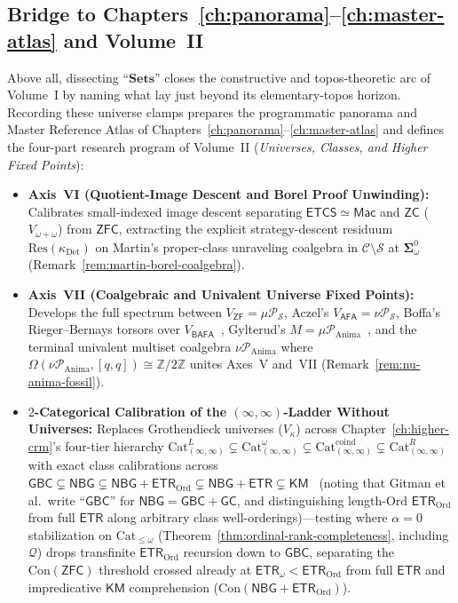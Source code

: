 \subsection{Bridge to Chapters~\ref{ch:panorama}--\ref{ch:master-atlas} and Volume~II}\label{subsec:sets-bridge-ch8}

Above all, dissecting ``$\mathbf{Sets}$'' closes the constructive and topos-theoretic arc of Volume~I by naming what lay just beyond its elementary-topos horizon. Recording these universe clamps prepares the programmatic panorama and Master Reference Atlas of Chapters~\ref{ch:panorama}--\ref{ch:master-atlas} and defines the four-part research program of Volume~II (\emph{Universes, Classes, and Higher Fixed Points}):
\begin{itemize}
  \item \textbf{Axis~VI (Quotient-Image Descent and Borel Proof Unwinding):} Calibrates small-indexed image descent separating $\mathsf{ETCS} \simeq \mathsf{Mac}$ and $\mathsf{ZC}$ ($V_{\omega+\omega}$) from $\mathsf{ZFC}$, extracting the explicit strategy-descent residuum $\mathrm{Res}(\kappa_{\mathrm{Det}})$ on Martin's proper-class unraveling coalgebra in $\mathcal{C} \setminus \mathcal{S}$ at $\boldsymbol{\Sigma}^0_\omega$~\cite{Friedman71,Martin75} (Remark~\ref{rem:martin-borel-coalgebra}).
  \item \textbf{Axis~VII (Coalgebraic and Univalent Universe Fixed Points):} Develops the full spectrum between $V_{\mathsf{ZF}} = \mu \mathcal{P}_{\mathcal{S}}$, Aczel's $V_{\mathsf{AFA}} = \nu \mathcal{P}_{\mathcal{S}}$, Boffa's Rieger--Bernays torsors over $V_{\mathsf{BAFA}}$~\cite{Bernays54,Rieger57,Boffa69}, Gylterud's $M = \mu \mathcal{P}_{\mathrm{Anima}}$~\cite{Gylterud18}, and the terminal univalent multiset coalgebra $\nu \mathcal{P}_{\mathrm{Anima}}$ where $\Omega(\nu \mathcal{P}_{\mathrm{Anima}}, [q, q]) \cong \mathbb{Z}/2\mathbb{Z}$ unites Axes~V and~VII (Remark~\ref{rem:nu-anima-fossil}).
  \item \textbf{$2$-Categorical Calibration of the $(\infty, \infty)$-Ladder Without Universes:} Replaces Grothendieck universes ($V_\kappa$) across Chapter~\ref{ch:higher-crm}'s four-tier hierarchy $\mathrm{Cat}^L_{(\infty,\infty)} \subsetneq \mathrm{Cat}^\omega_{(\infty,\infty)} \subsetneq \mathrm{Cat}^{\mathrm{coind}}_{(\infty,\infty)} \subsetneq \mathrm{Cat}^R_{(\infty,\infty)}$~\cite{ORW26} with exact class calibrations across $\mathsf{GBC} \subsetneq \mathsf{NBG} \subsetneq \mathsf{NBG}+\mathsf{ETR}_{\mathrm{Ord}} \subsetneq \mathsf{NBG}+\mathsf{ETR} \subsetneq \mathsf{KM}$~\cite[Thm.~1.2]{Gitman20} (noting that Gitman et al.\ write ``$\mathsf{GBC}$'' for $\mathsf{NBG} = \mathsf{GBC} + \mathsf{GC}$, and distinguishing length-$\mathrm{Ord}$ $\mathsf{ETR}_{\mathrm{Ord}}$ from full $\mathsf{ETR}$ along arbitrary class well-orderings)---testing where $\alpha = 0$ stabilization on $\mathrm{Cat}_{\le \omega}$ (Theorem~\ref{thm:ordinal-rank-completeness}, including $\mathcal{Q}$) drops transfinite $\mathsf{ETR}_{\mathrm{Ord}}$ recursion down to $\mathsf{GBC}$, separating the $\mathrm{Con}(\mathsf{ZFC})$ threshold crossed already at $\mathsf{ETR}_\omega < \mathsf{ETR}_{\mathrm{Ord}}$ from full $\mathsf{ETR}$ and impredicative $\mathsf{KM}$ comprehension ($\mathrm{Con}(\mathsf{NBG}+\mathsf{ETR}_{\mathrm{Ord}})$).

\end{itemize}
